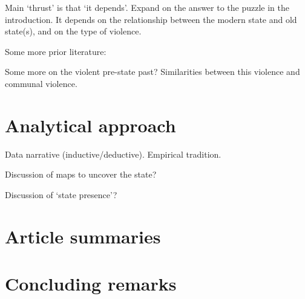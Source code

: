 \documentclass[12pt]{article}
\begin{document}
\citet{Dincecco_2019}


Main `thrust' is that `it depends'. Expand on the answer to the puzzle in the
introduction. It depends on the relationship between the modern state and old
state(s), and on the type of violence.

Some more prior literature: \citet{Griffiths2016} \citet{Ahram2019}

Some more on the violent pre-state past? Similarities between this violence and
communal violence.

\section{Analytical approach} \label{Analytical approach}

Data narrative (inductive/deductive). Empirical tradition.

Discussion of maps to uncover the state?

Discussion of `state presence'?

\section{Article summaries} \label{Article summaries}

\section{Concluding remarks} \label{Concluding remarks}

\pagebreak



\end{document}
